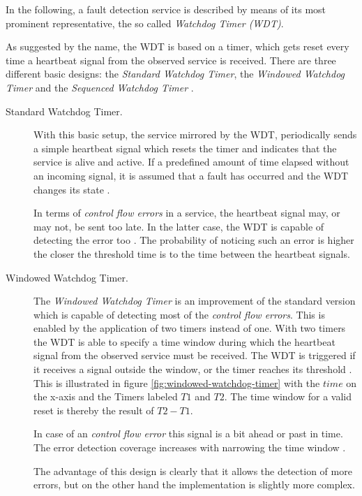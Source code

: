 In the following, a fault detection service is described by means of its most prominent representative, the so called \emph{Watchdog Timer (WDT)}.

As suggested by the name, the WDT is based on a timer, which gets reset every time a heartbeat signal from the observed service is received. There are three different basic designs: the \emph{Standard Watchdog Timer}, the \emph{Windowed Watchdog Timer} and the \emph{Sequenced Watchdog Timer} \cite{elattar2007}.


\begin{description}
\item [Standard Watchdog Timer.]
With this basic setup, the service mirrored by the WDT, periodically sends a simple heartbeat signal which resets the timer and indicates that the service is alive and active. If a predefined amount of time elapsed without an incoming signal, it is assumed that a fault has occurred and the WDT changes its state \cite{elattar2007}.

In terms of \emph{control flow errors} in a service, the heartbeat signal may, or may not, be sent too late. In the latter case, the WDT is capable of detecting the error too \cite{elattar2007}. The probability of noticing such an error is higher the closer the threshold time is to the time between the heartbeat signals.

\item [Windowed Watchdog Timer.]
The \emph{Windowed Watchdog Timer} is an improvement of the standard version which is capable of detecting most of the \emph{control flow errors}. This is enabled by the application of two timers instead of one. With two timers the WDT is able to specify a time window during which the heartbeat signal from the observed service must be received. The WDT is triggered if it receives a signal outside the window, or the timer reaches its threshold \cite{elattar2007}. This is illustrated in figure \ref{fig:windowed-watchdog-timer} with the $time$ on the x-axis and the Timers labeled $T1$ and $T2$. The time window for a valid reset is thereby the result of $T2 - T1$.

In case of an \emph{control flow error} this signal is a bit ahead or past in time. The error detection coverage increases with narrowing the time window \cite{elattar2007}.  

The advantage of this design is clearly that it allows the detection of more errors, but on the other hand the implementation is slightly more complex.


\end{description}
